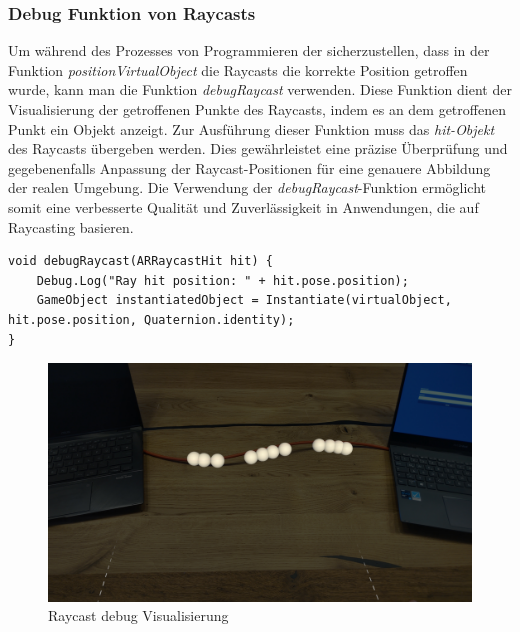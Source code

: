 \subsubsection{Debug Funktion von Raycasts}
Um während des Prozesses von Programmieren der sicherzustellen, dass in der Funktion \textit{positionVirtualObject} die Raycasts die korrekte Position getroffen wurde, kann man die Funktion \textit{debugRaycast} verwenden. Diese Funktion dient der Visualisierung der getroffenen Punkte des Raycasts, indem es an dem getroffenen Punkt ein Objekt anzeigt. Zur Ausführung dieser Funktion muss das \textit{hit-Objekt} des Raycasts übergeben werden. Dies gewährleistet eine präzise Überprüfung und gegebenenfalls Anpassung der Raycast-Positionen für eine genauere Abbildung der realen Umgebung. Die Verwendung der \textit{debugRaycast}-Funktion ermöglicht somit eine verbesserte Qualität und Zuverlässigkeit in Anwendungen, die auf Raycasting basieren.
\begin{lstlisting}[style=csharp, caption={Debug Funktion von Raycasts}, label=code:debugRaycast]
void debugRaycast(ARRaycastHit hit) {
    Debug.Log("Ray hit position: " + hit.pose.position);
    GameObject instantiatedObject = Instantiate(virtualObject, hit.pose.position, Quaternion.identity);
}
\end{lstlisting}
\begin{figure}[H]
    \centering
    \includegraphics[width=1\linewidth]{images/RaycastDebug.jpg}
    \caption{Raycast debug Visualisierung}
    \label{fig:RaycastDebugVisualisierung}
\end{figure}
